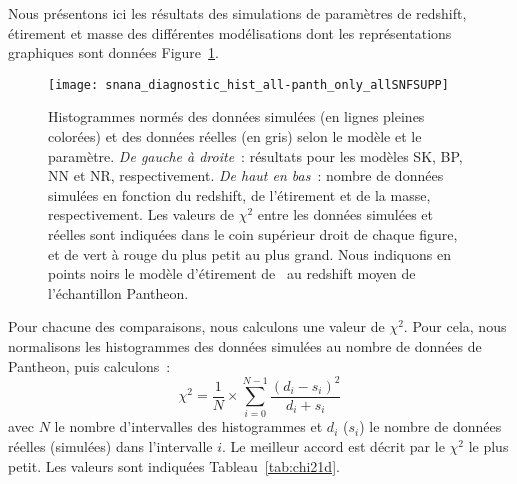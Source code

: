 \documentclass[../main/main.tex]{subfiles}
\begin{document}
Nous présentons ici les résultats des simulations de paramètres de redshift,
étirement et masse des différentes modélisations dont les représentations
graphiques sont données Figure~\ref{fig:hist1d}.

\begin{figure}[ht]
    \centering
    \texttt{[image: snana\_diagnostic\_hist\_all-panth\_only\_allSNFSUPP]}
    \caption[Histogrammes uni-dimensionnels des données simulées et réelles]
        {Histogrammes normés des données simulées (en lignes pleines
        colorées) et des données réelles (en gris) selon le modèle et le
        paramètre. \textit{De gauche à droite}~: résultats pour les modèles SK,
        BP, NN et NR, respectivement. \textit{De haut en bas}~: nombre de
        données simulées en fonction du redshift, de l'étirement et de la masse,
        respectivement. Les valeurs de $\chi^2$ entre les données simulées et
        réelles sont indiquées dans le coin supérieur droit de chaque figure, et
        de vert à rouge du plus petit au plus grand. Nous indiquons en points
        noirs le modèle d'étirement de~ au redshift
        moyen de l'échantillon Pantheon.}
    \label{fig:hist1d}
\end{figure}

Pour chacune des comparaisons, nous calculons une valeur de $\chi^2$. Pour cela,
nous normalisons les histogrammes des données simulées au nombre de données de
Pantheon, puis calculons~:
\begin{equation}\label{eq:chi21d}
    \chi^2 = \frac{1}{N}\times\sum_{i=0}^{N-1} \frac{(d_i - s_i)^2}{d_i+s_i}
\end{equation}
avec $N$ le nombre d'intervalles des histogrammes et $d_i$ ($s_i$) le nombre de
données réelles (simulées) dans l'intervalle $i$. Le meilleur accord est décrit
par le $\chi^2$ le plus petit. Les valeurs sont indiquées
Tableau~\ref{tab:chi21d}.
\end{document}
